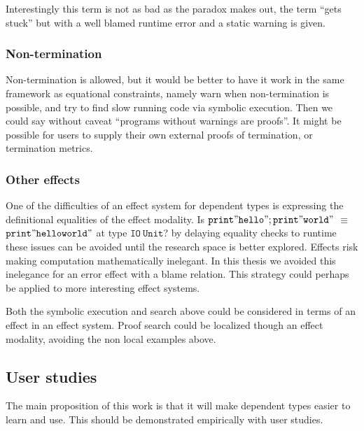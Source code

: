Interestingly this term is not as bad as the paradox makes out, the
term ``gets stuck'' but with a well blamed runtime error and a static
warning is given.


\subsubsection{Non-termination}

Non-termination is allowed, but it would be better to have it work
in the same framework as equational constraints, namely warn when
non-termination is possible, and try to find slow running code via
symbolic execution. Then we could say without caveat ``programs without
warnings are proofs''. It might be possible for users to supply their
own external proofs of termination\cite{casinghino2014combining},
or termination metrics.

\subsubsection{Other effects}

One of the difficulties of an effect system for dependent types is
expressing the definitional equalities of the effect modality. Is
$\mathtt{print"hello";print"world"}$
$\equiv$ $\mathtt{print"helloworld"}$
at type $\mathtt{IO\ Unit}$? by delaying equality checks to runtime
these issues can be avoided until the research space is better explored.
Effects risk making computation mathematically inelegant. In this
thesis we avoided this inelegance for an error effect with a blame
relation. This strategy could perhaps be applied to more interesting
effect systems.

Both the symbolic execution and search above could be considered in
terms of an effect in an effect system. Proof search could be localized
though an effect modality, avoiding the non local examples above.

\subsection{User studies}

The main proposition of this work is that it will make dependent types
easier to learn and use. This should be demonstrated empirically with
user studies.

